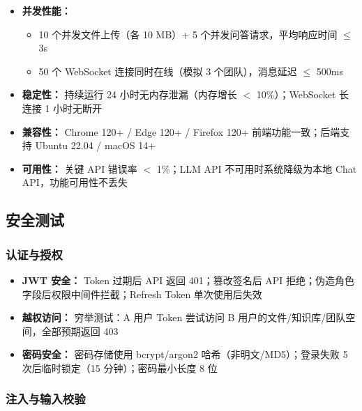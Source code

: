 \documentclass[a4paper,zihao=-4]{ctexart}
\begin{document}
\begin{itemize}
  \item \textbf{并发性能：}
        \begin{itemize}
          \item 10 个并发文件上传（各 10 MB）+ 5 个并发问答请求，平均响应时间 $\leq$ 3s
          \item 50 个 WebSocket 连接同时在线（模拟 3 个团队），消息延迟 $\leq$ 500ms
        \end{itemize}
  \item \textbf{稳定性：} 持续运行 24 小时无内存泄漏（内存增长 $<$ 10\%）；WebSocket 长连接 1 小时无断开
  \item \textbf{兼容性：} Chrome 120+ / Edge 120+ / Firefox 120+ 前端功能一致；后端支持
        Ubuntu
        22.04 / macOS 14+
  \item \textbf{可用性：} 关键 API 错误率 $<$ 1\%；LLM API 不可用时系统降级为本地
        Chat API，功能可用性不丢失
\end{itemize}

\subsection{安全测试}

\subsubsection{认证与授权}

\begin{itemize}
  \item \textbf{JWT 安全：} Token 过期后 API 返回 401；篡改签名后 API
        拒绝；伪造角色字段后权限中间件拦截；Refresh Token 单次使用后失效
  \item \textbf{越权访问：} 穷举测试：A 用户 Token 尝试访问 B 用户的文件/知识库/团队空间，全部预期返回 403
  \item \textbf{密码安全：} 密码存储使用 bcrypt/argon2 哈希（非明文/MD5）；登录失败 5 次后临时锁定（15
        分钟）；密码最小长度 8 位
\end{itemize}

\subsubsection{注入与输入校验}
\end{document}
